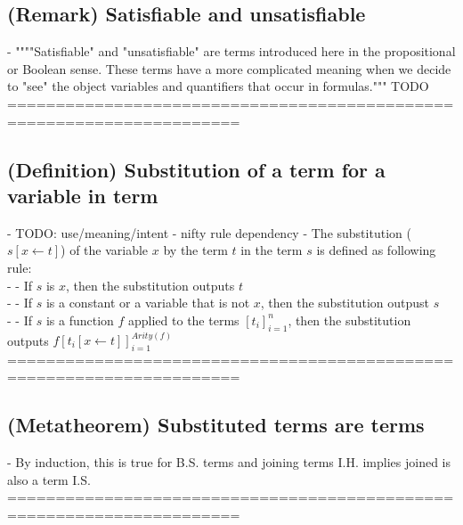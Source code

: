 \documentclass{article}
\begin{document}
\subsection{(Remark) Satisfiable and unsatisfiable}
	- """"Satisfiable" and "unsatisfiable" are terms introduced here in the propositional or Boolean sense. These terms have a more complicated meaning when we decide to "see" the object variables and quantifiers that occur in formulas.""" TODO
	======================================================================
\subsection{(Definition) Substitution of a term for a variable in term}
	- TODO: use/meaning/intent - nifty rule dependency
	- The substitution ($s[x \leftarrow t]$) of the variable $x$ by the term $t$ in the term $s$ is defined as following rule: \\
		- - If $s$ is $x$, then the substitution outputs $t$ \\
		- - If $s$ is a constant or a variable that is not $x$, then the substitution outpust $s$ \\
		- - If $s$ is a function $f$ applied to the terms $[t_i]_{i=1}^n$, then the substitution outputs $f [t_i[x \leftarrow t]]_{i=1}^{Arity(f)}$ \\
	======================================================================
\subsection{(Metatheorem) Substituted terms are terms}
	- By induction, this is true for B.S. terms and joining terms I.H. implies joined is also a term I.S. \\
	======================================================================
\end{document}
